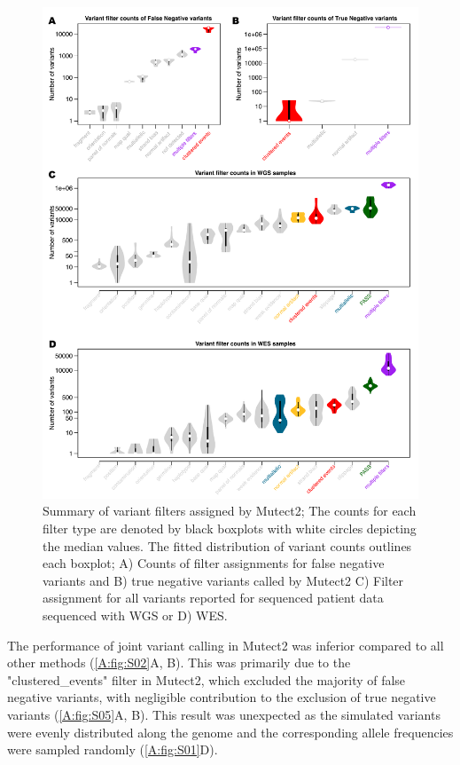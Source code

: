 \begin{figure}[htp]
\centering
  \includegraphics[width=\textwidth]{Appendices/Variantcalling/supp/S5}
  \caption[Summary of variant filters assigned by Mutect2]{Summary of variant filters assigned by Mutect2; The counts for each filter type are denoted by black boxplots with white circles depicting the median values. The fitted distribution of variant counts outlines each boxplot; A) Counts of filter assignments for false negative variants and B) true negative variants called by Mutect2 C) Filter assignment for all variants reported for sequenced patient data sequenced with WGS or D) WES.}\label{A:fig:S05}
\end{figure}


The performance of joint variant calling in Mutect2 was inferior compared to all other methods (\autoref{A:fig:S02}A, B). This was primarily due to the "clustered\_events" filter in Mutect2, which excluded the majority of false negative variants, with negligible contribution to the exclusion of true negative variants (\autoref{A:fig:S05}A, B). This result was unexpected as the simulated variants were evenly distributed along the genome and the corresponding allele frequencies were sampled randomly (\autoref{A:fig:S01}D).


